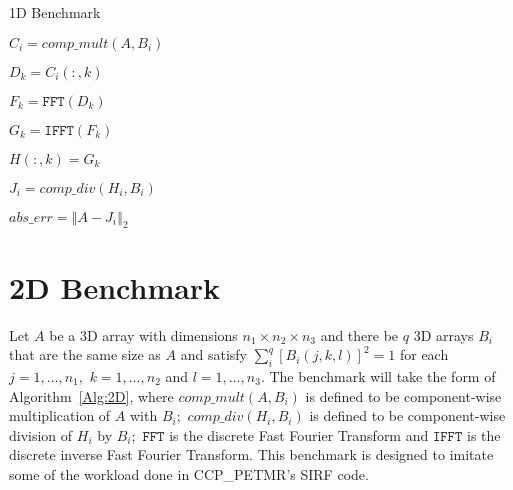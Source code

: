 \documentclass[a4]{article}
\newcommand{\norm}[1]{\left\Vert#1\right\Vert}
\begin{document}
\begin{algorithm}\caption{1D Benchmark}\label{Alg:1D}
\noindent \hrulefill

\begin{algorithmic}



\STATE $C_i = comp\_mult(A,B_i)$



\STATE $D_k = C_i(:,k)$

\STATE $F_k = \texttt{FFT}(D_k)$


\STATE $G_k = \texttt{IFFT}(F_k)$

\STATE $H(:,k) = G_k$

\ENDIF


\ENDFOR


\STATE $J_i = comp\_div(H_i,B_i) $

\STATE $abs\_err = \norm{A-J_i}_2$

\ENDIF

\ENDFOR

\end{algorithmic}
\noindent \hrulefill

\end{algorithm}

\section{2D Benchmark}
Let $A$ be a 3D array with dimensions $n_1\times n_2\times n_3$ and there be $q$ 
3D arrays $B_i$ that are the same size as $A$ and satisfy 
$\sum_i^q \left[B_i(j,k,l)  \right]^2 = 1$ for each $j=1,\ldots,n_1,$ 
$k=1,\ldots,n_2$ and $l=1,\ldots,n_3.$  The benchmark will take the form of 
Algorithm~\ref{Alg:2D}, where $comp\_mult(A,B_i)$ is defined to be 
component-wise multiplication of $A$ with $B_i;$  $comp\_div(H_i,B_i)$ 
is defined to be component-wise division of $H_i$ by $B_i;$ $\texttt{FFT}$ 
is the discrete Fast Fourier Transform and $\texttt{IFFT}$ is the 
discrete inverse Fast Fourier Transform. This benchmark is designed to imitate some of the workload done in CCP\_PETMR's SIRF code.
\end{document}
